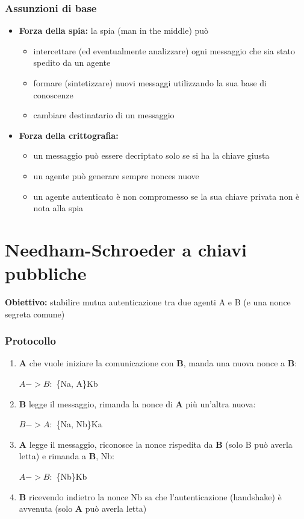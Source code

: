 \subsubsection{Assunzioni di base}
\begin{itemize}
    \item \textbf{Forza della spia:} la spia (man in the middle) può
    \begin{itemize}
        \item intercettare (ed eventualmente analizzare) ogni messaggio che sia stato spedito da un agente
        \item formare (sintetizzare) nuovi messaggi utilizzando la sua base di conoscenze
        \item cambiare destinatario di un messaggio
    \end{itemize}
    \item \textbf{Forza della crittografia:} 
    \begin{itemize}
        \item un messaggio può essere decriptato solo se si ha la chiave giusta
        \item un agente può generare sempre nonces nuove
        \item un agente autenticato è non compromesso se la sua chiave privata non è nota alla spia
    \end{itemize}
\end{itemize}

\section{Needham-Schroeder a chiavi pubbliche}
\noindent \textbf{Obiettivo:} stabilire mutua autenticazione tra due agenti A e B (e una nonce segreta comune)
\subsubsection{Protocollo}
\begin{enumerate}
    \item \textbf{A} che vuole iniziare la comunicazione con \textbf{B}, manda una nuova nonce a \textbf{B}:
    \begin{center}
        $A->B :$ \{Na, A\}Kb
    \end{center}
    \item \textbf{B} legge il messaggio, rimanda la nonce di \textbf{A} più un'altra nuova:
    \begin{center}
        $B->A :$ \{Na, Nb\}Ka
    \end{center}
    \item \textbf{A} legge il messaggio, riconosce la nonce rispedita da \textbf{B} (solo B può averla letta) e rimanda a \textbf{B}, Nb:
    \begin{center}
        $A->B :$ \{Nb\}Kb
    \end{center}
    \item \textbf{B} ricevendo indietro la nonce Nb sa che l'autenticazione (handshake) è avvenuta (solo \textbf{A} può averla letta)
\end{enumerate}

